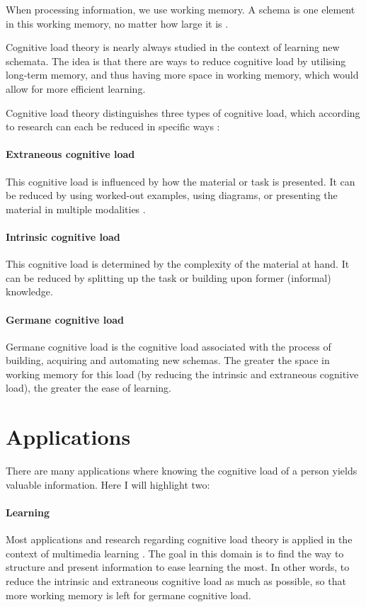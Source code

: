 \documentclass[11pt,leqno,a4paper]{report} %
\begin{document}
When processing information, we use working memory. A schema is one element in this working memory, no matter how large it is \citep{mayer2014cambridge}. 

Cognitive load theory is nearly always studied in the context of learning new schemata. The idea is that there are ways to reduce cognitive load by utilising long-term memory, and thus having more space in working memory, which would allow for more efficient learning.

Cognitive load theory distinguishes three types of cognitive load, which according to research can each be reduced in specific ways \citep{mayer2002multimedia}:


\paragraph{Extraneous cognitive load}
This cognitive load is influenced by how the material or task is presented. It can be reduced by using worked-out examples, using diagrams, or presenting the material in multiple modalities \citep{mousavi1995reducing}.

\paragraph{Intrinsic cognitive load}
This cognitive load is determined by the complexity of the material at hand. It can be reduced by splitting up the task or building upon former (informal) knowledge.

\paragraph{Germane cognitive load}
Germane cognitive load is the cognitive load associated with the process of building, acquiring and automating new schemas. The greater the space in working memory for this load (by reducing the intrinsic and extraneous cognitive load), the greater the ease of learning.

\section{Applications}
There are many applications where knowing the cognitive load of a person yields valuable information. Here I will highlight two:

\paragraph{Learning}
Most applications and research regarding cognitive load theory is applied in the context of multimedia learning \citep{brunken2003direct}. The goal in this domain is to find the way to structure and present information to ease learning the most. In other words, to reduce the intrinsic and extraneous cognitive load as much as possible, so that more working memory is left for germane cognitive load.
\end{document}
